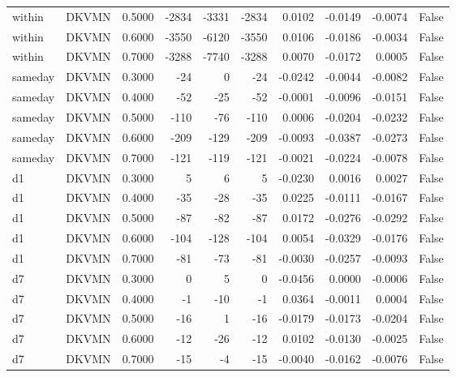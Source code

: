 \begin{tabular}{llrrrrrrrr}
within & DKVMN & 0.5000 & -2834 & -3331 & -2834 & 0.0102 & -0.0149 & -0.0074 & False \\
within & DKVMN & 0.6000 & -3550 & -6120 & -3550 & 0.0106 & -0.0186 & -0.0034 & False \\
within & DKVMN & 0.7000 & -3288 & -7740 & -3288 & 0.0070 & -0.0172 & 0.0005 & False \\
sameday & DKVMN & 0.3000 & -24 & 0 & -24 & -0.0242 & -0.0044 & -0.0082 & False \\
sameday & DKVMN & 0.4000 & -52 & -25 & -52 & -0.0001 & -0.0096 & -0.0151 & False \\
sameday & DKVMN & 0.5000 & -110 & -76 & -110 & 0.0006 & -0.0204 & -0.0232 & False \\
sameday & DKVMN & 0.6000 & -209 & -129 & -209 & -0.0093 & -0.0387 & -0.0273 & False \\
sameday & DKVMN & 0.7000 & -121 & -119 & -121 & -0.0021 & -0.0224 & -0.0078 & False \\
d1 & DKVMN & 0.3000 & 5 & 6 & 5 & -0.0230 & 0.0016 & 0.0027 & False \\
d1 & DKVMN & 0.4000 & -35 & -28 & -35 & 0.0225 & -0.0111 & -0.0167 & False \\
d1 & DKVMN & 0.5000 & -87 & -82 & -87 & 0.0172 & -0.0276 & -0.0292 & False \\
d1 & DKVMN & 0.6000 & -104 & -128 & -104 & 0.0054 & -0.0329 & -0.0176 & False \\
d1 & DKVMN & 0.7000 & -81 & -73 & -81 & -0.0030 & -0.0257 & -0.0093 & False \\
d7 & DKVMN & 0.3000 & 0 & 5 & 0 & -0.0456 & 0.0000 & -0.0006 & False \\
d7 & DKVMN & 0.4000 & -1 & -10 & -1 & 0.0364 & -0.0011 & 0.0004 & False \\
d7 & DKVMN & 0.5000 & -16 & 1 & -16 & -0.0179 & -0.0173 & -0.0204 & False \\
d7 & DKVMN & 0.6000 & -12 & -26 & -12 & 0.0102 & -0.0130 & -0.0025 & False \\
d7 & DKVMN & 0.7000 & -15 & -4 & -15 & -0.0040 & -0.0162 & -0.0076 & False \\
\bottomrule
\end{tabular}
